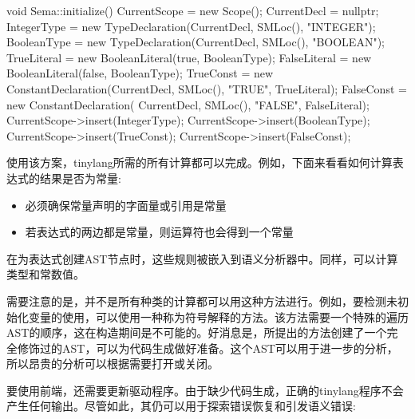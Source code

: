 \begin{cpp}
void Sema::initialize() {
    CurrentScope = new Scope();
    CurrentDecl = nullptr;
    IntegerType =
        new TypeDeclaration(CurrentDecl, SMLoc(), "INTEGER");
    BooleanType =
        new TypeDeclaration(CurrentDecl, SMLoc(), "BOOLEAN");
    TrueLiteral = new BooleanLiteral(true, BooleanType);
    FalseLiteral = new BooleanLiteral(false, BooleanType);
    TrueConst = new ConstantDeclaration(CurrentDecl, SMLoc(),
                                        "TRUE", TrueLiteral);
    FalseConst = new ConstantDeclaration(
        CurrentDecl, SMLoc(), "FALSE", FalseLiteral);
    CurrentScope->insert(IntegerType);
    CurrentScope->insert(BooleanType);
    CurrentScope->insert(TrueConst);
    CurrentScope->insert(FalseConst);
}
\end{cpp}

使用该方案，tinylang所需的所有计算都可以完成。例如，下面来看看如何计算表达式的结果是否为常量:

\begin{itemize}
\item
必须确保常量声明的字面量或引用是常量

\item
若表达式的两边都是常量，则运算符也会得到一个常量
\end{itemize}

在为表达式创建AST节点时，这些规则被嵌入到语义分析器中。同样，可以计算类型和常数值。

需要注意的是，并不是所有种类的计算都可以用这种方法进行。例如，要检测未初始化变量的使用，可以使用一种称为符号解释的方法。该方法需要一个特殊的遍历AST的顺序，这在构造期间是不可能的。好消息是，所提出的方法创建了一个完全修饰过的AST，可以为代码生成做好准备。这个AST可以用于进一步的分析，所以昂贵的分析可以根据需要打开或关闭。

要使用前端，还需要更新驱动程序。由于缺少代码生成，正确的tinylang程序不会产生任何输出。尽管如此，其仍可以用于探索错误恢复和引发语义错误:

